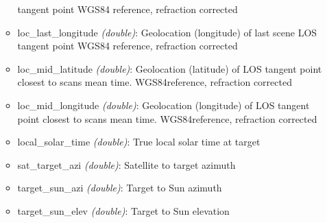 \begin{itemize}
\begin{itemize}
                tangent point WGS84 reference, refraction corrected
            \item loc\_last\_longitude \emph{(double)}: Geolocation (longitude) of last scene LOS
                tangent point WGS84 reference, refraction corrected
            \item loc\_mid\_latitude \emph{(double)}: Geolocation (latitude) of LOS tangent point
                closest to scans mean time. WGS84reference, refraction corrected 
            \item loc\_mid\_longitude \emph{(double)}: Geolocation (longitude) of LOS tangent point
                closest to scans mean time. WGS84reference, refraction corrected
            \item local\_solar\_time \emph{(double)}: True local solar time at target
            \item sat\_target\_azi \emph{(double)}: Satellite to target azimuth 
            \item target\_sun\_azi \emph{(double)}: Target to Sun azimuth 
            \item target\_sun\_elev \emph{(double)}: Target to Sun elevation 
         \end{itemize}
\end{itemize}


